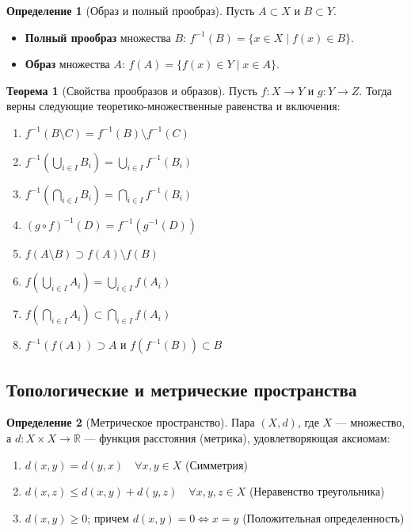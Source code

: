 \documentclass[12pt,a4paper]{article}
\theoremstyle{definition}
\newtheorem{definition}{Определение}[section]
\newtheorem{theorem}{Теорема}[section]
\begin{document}
\begin{definition}[Образ и полный прообраз]
Пусть $A \subset X$ и $B \subset Y$.
\begin{itemize}
    \item \textbf{Полный прообраз} множества $B$: $f^{-1}(B) = \{x \in X \mid f(x) \in B\}$.
    \item \textbf{Образ} множества $A$: $f(A) = \{f(x) \in Y \mid x \in A\}$.
\end{itemize}
\end{definition}

\begin{theorem}[Свойства прообразов и образов]
Пусть $f: X \to Y$ и $g: Y \to Z$. Тогда верны следующие теоретико-множественные равенства и включения:
\begin{enumerate}
    \item $f^{-1}(B \setminus C) = f^{-1}(B) \setminus f^{-1}(C)$
    \item $f^{-1}\left(\bigcup_{i \in I} B_i\right) = \bigcup_{i \in I} f^{-1}(B_i)$
    \item $f^{-1}\left(\bigcap_{i \in I} B_i\right) = \bigcap_{i \in I} f^{-1}(B_i)$
    \item $(g \circ f)^{-1}(D) = f^{-1}(g^{-1}(D))$
    \item $f(A \setminus B) \supset f(A) \setminus f(B)$
    \item $f\left(\bigcup_{i \in I} A_i\right) = \bigcup_{i \in I} f(A_i)$
    \item $f\left(\bigcap_{i \in I} A_i\right) \subset \bigcap_{i \in I} f(A_i)$
    \item $f^{-1}(f(A)) \supset A$ и $f(f^{-1}(B)) \subset B$
\end{enumerate}
\end{theorem}\subsection{Топологические и метрические пространства}

\begin{definition}[Метрическое пространство]
Пара $(X, d)$, где $X$ --- множество, а $d: X \times X \to \mathbb{R}$ --- функция расстояния (метрика), удовлетворяющая аксиомам:
\begin{enumerate}
    \item $d(x, y) = d(y, x) \quad \forall x,y \in X$ (Симметрия)
    \item $d(x, z) \leqslant d(x, y) + d(y, z) \quad \forall x,y,z \in X$ (Неравенство треугольника)
    \item $d(x, y) \geqslant 0$; причем $d(x, y) = 0 \iff x = y$ (Положительная определенность)
\end{enumerate}
\end{definition}
\end{document}
